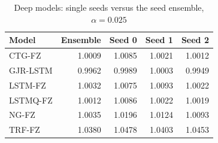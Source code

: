 \begin{table}[htbp]
\centering
\footnotesize
\caption{Deep models: single seeds versus the seed ensemble, $\alpha=0.025$}
\label{tab:seeds}
\begin{tabular}{lrrrr}
\toprule
Model & Ensemble & Seed 0 & Seed 1 & Seed 2 \\
\midrule
CTG-FZ & 1.0009 & 1.0085 & 1.0021 & 1.0012 \\
GJR-LSTM & 0.9962 & 0.9989 & 1.0003 & 0.9949 \\
LSTM-FZ & 1.0032 & 1.0075 & 1.0093 & 1.0022 \\
LSTMQ-FZ & 1.0012 & 1.0086 & 1.0022 & 1.0019 \\
NG-FZ & 1.0035 & 1.0196 & 1.0124 & 1.0093 \\
TRF-FZ & 1.0380 & 1.0478 & 1.0403 & 1.0453 \\
\bottomrule
\end{tabular}
\end{table}